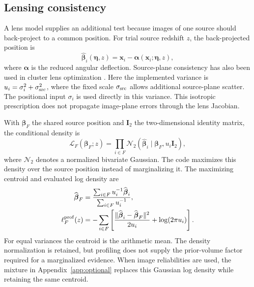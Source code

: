 \documentclass[twocolumn,twocolappendix,linenumbers]{aastex701}
\newcommand{\N}{\mathcal{N}}
\begin{document}
\subsection{Lensing consistency}
\label{sec:lensing}
A lens model supplies an additional test because images of one source should back-project to a common position.
For trial source redshift $z$, the back-projected position is
\begin{equation}
 \widehat{\boldsymbol{\beta}}_i(\boldsymbol{\eta},z)
 =\boldsymbol{x}_i-
 \boldsymbol{\alpha}(\boldsymbol{x}_i;\boldsymbol{\eta},z),
 \label{eq:lens}
\end{equation}
where $\boldsymbol{\alpha}$ is the reduced angular deflection.
Source-plane consistency has also been used in cluster lens optimization \citep{Jullo2007}.
Here the implemented variance is $u_i=\sigma_i^2+\sigma_{\rm src}^2$, where the fixed scale $\sigma_{\rm src}$ allows additional source-plane scatter.
The positional input $\sigma_i$ is used directly in this variance.
This isotropic prescription does not propagate image-plane errors through the lens Jacobian.

With $\boldsymbol{\beta}_F$ the shared source position and $\boldsymbol I_2$ the two-dimensional identity matrix, the conditional density is
\begin{equation}
 \mathcal L_F(\boldsymbol{\beta}_F;z)
 =\prod_{i\in F}\N_2\!\left(
 \widehat{\boldsymbol{\beta}}_i\mid
 \boldsymbol{\beta}_F,u_i\boldsymbol{I}_2\right),
 \label{eq:lensjoint}
\end{equation}
where $\N_2$ denotes a normalized bivariate Gaussian.
The code maximizes this density over the source position instead of marginalizing it.
The maximizing centroid and evaluated log density are
\begin{equation}
 \begin{aligned}
 \widehat{\boldsymbol{\beta}}_F
 &=\frac{\sum_{i\in F}u_i^{-1}\widehat{\boldsymbol{\beta}}_i}
          {\sum_{i\in F}u_i^{-1}},\\
 \ell_F^{\rm prof}(z)
 &=-\sum_{i\in F}\left[
 \frac{\|\widehat{\boldsymbol{\beta}}_i-
             \widehat{\boldsymbol{\beta}}_F\|^2}{2u_i}
 +\log(2\pi u_i)\right].
 \end{aligned}
 \label{eq:profile}
\end{equation}
For equal variances the centroid is the arithmetic mean.
The density normalization is retained, but profiling does not supply the prior-volume factor required for a marginalized evidence.
When image reliabilities are used, the mixture in Appendix~\ref{app:optional} replaces this Gaussian log density while retaining the same centroid.
\end{document}
